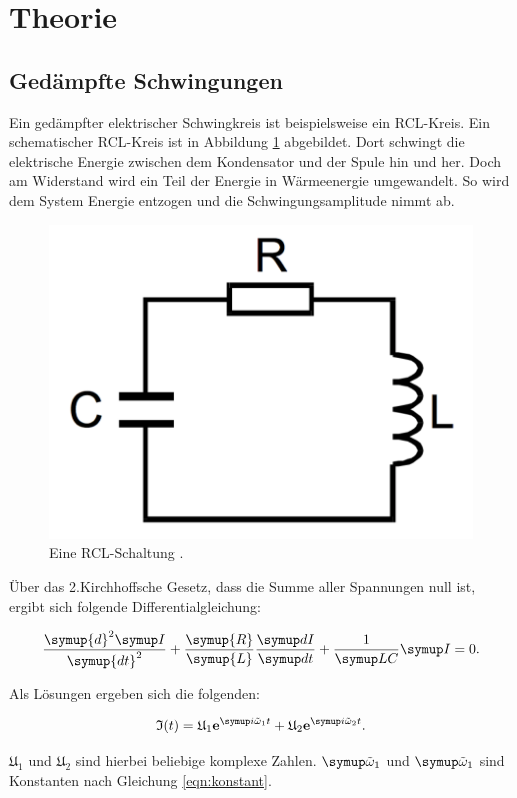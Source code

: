 \section{Theorie}
\label{sec:Theorie}

\subsection{Gedämpfte Schwingungen}
\label{sec:gedschw}

Ein gedämpfter elektrischer Schwingkreis ist beispielsweise ein RCL-Kreis.
 Ein schematischer RCL-Kreis ist
in Abbildung \ref{fig:rcl} abgebildet.
Dort schwingt die elektrische Energie zwischen dem Kondensator und der Spule
hin und her. Doch am Widerstand wird ein Teil der Energie in Wärmeenergie umgewandelt.
So wird dem System Energie entzogen und die Schwingungsamplitude nimmt ab.

\begin{figure}[h]
  \centering
  \includegraphics[height = 4 cm]{RCL.pdf}
  \caption{Eine RCL-Schaltung \cite{anleitung}.}
  \label{fig:rcl}
\end{figure}

Über das 2.Kirchhoffsche Gesetz, dass die Summe aller Spannungen null ist, ergibt
sich folgende Differentialgleichung:

\begin{equation}
  \frac{\symup{d}^2 \g{I}}{\symup{d t}^2} + \frac{\symup{R}}{\symup{L}}
  \frac{\g{d I}}{\g{d t}} + \frac{1}{\g{L C}} \g{I} = 0.
  \label{eqn:dgl}
\end{equation}

Als Lösungen ergeben sich die folgenden:

\begin{equation}
  \mathfrak{I}(t) = \mathfrak{U}_1 \textbf{e}^{\g{i\tilde{\omega}_1t}} + \mathfrak{U}_2
  \textbf{e}^{\g{i\tilde{\omega}_2t}}.
\end{equation}

$\mathfrak{U}_1$ und $\mathfrak{U}_2$ sind hierbei beliebige komplexe Zahlen.
$\g{\tilde{\omega}}_\text{1}$ und $\g{\tilde{\omega}}_\text{1}$ sind Konstanten nach Gleichung
\eqref{eqn:konstant}.


